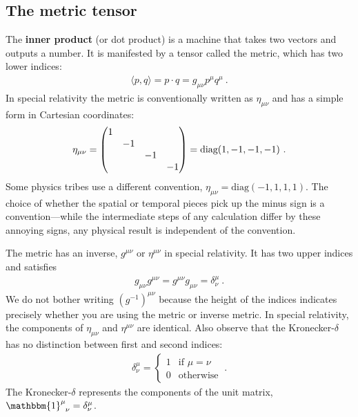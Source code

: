 \documentclass[12pt, oneside]{report}    %
\begin{document}
\subsection{The metric tensor}

The \textbf{inner product} (or dot product) is a machine that takes two vectors and outputs a number. It is manifested by a tensor called the metric, which has two lower indices:
\begin{align}
    \langle p,q\rangle = p\cdot q = g_{\mu\nu}p^\mu q^\mu \ .
\end{align}
In special relativity the metric is conventionally written as $\eta_{\mu\nu}$ and has a simple form in Cartesian coordinates:
\begin{align}
    \eta_{\mu\nu} = 
    \begin{pmatrix}
        1 & & & \\
        & -1 & & \\
        & & -1 & \\
        & & & -1
    \end{pmatrix}
    = \textnormal{diag}(1,-1,-1,-1) \ .
\end{align}
Some physics tribes use a different convention, $\eta_{\mu\nu} = \text{diag}(-1,1,1,1)$. The choice of whether the spatial or temporal pieces pick up the minus sign is a convention---while the intermediate steps of any calculation differ by these annoying signs, any physical result is independent of the convention.


The metric has an inverse, $g^{\mu\nu}$ or $\eta^{\mu\nu}$ in special relativity. It has two upper indices and satisfies
\begin{align}
    g_{\mu\nu}g^{\mu\nu} = g^{\mu\nu}g_{\mu\nu} = \delta^\mu_\nu \ .
\end{align}
We do not bother writing $(g^{-1})^{\mu\nu}$ because the height of the indices indicates precisely whether you are using the metric or inverse metric. In special relativity, the components of $\eta_{\mu\nu}$ and $\eta^{\mu\nu}$ are identical. Also observe that the Kronecker-$\delta$ has no distinction between first and second indices:
\begin{align}
    \delta^\mu_\nu =
    \begin{cases}
    1 & \text{if } \mu = \nu \\
    0 & \text{otherwise} 
    \end{cases}
    \ .
\end{align}
The Kronecker-$\delta$ represents the components of the unit matrix, $\mathbbm{1}\aij{\mu}{\nu} = \delta^\mu_\nu$.
\end{document}
